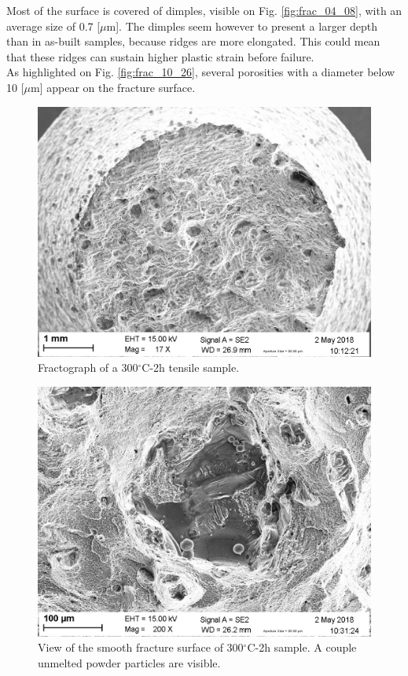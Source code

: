 Most of the surface is covered of dimples, visible on Fig. \ref{fig:frac_04_08}, with an average size of 0.7 [$\mu$m]. The dimples seem however to present a larger depth than in as-built samples, because ridges are more elongated. This could mean that these ridges can sustain higher plastic strain before failure.\\

As highlighted on Fig. \ref{fig:frac_10_26}, several porosities with a diameter below 10 [$\mu$m] appear on the fracture surface. \\

\begin{figure}[ht]
	\centering
	\centerline{\includegraphics[scale=0.40]{Images/frac-04_01.jpg}}
	\decoRule
	\caption[Fractograph of a 300$^\circ$C-2h tensile sample]{Fractograph of a 300$^\circ$C-2h tensile sample.}
	\label{fig:frac_04_01}
\end{figure}

\begin{figure}[ht]
	\centering
	\centerline{\includegraphics[scale=0.40]{Images/frac-04_11.jpg}}
	\decoRule
	\caption[View of the smooth fracture surface of 300$^\circ$C-2h sample. A couple unmelted powder particles are visible]{View of the smooth fracture surface of 300$^\circ$C-2h sample. A couple unmelted powder particles are visible.}
	\label{fig:frac_04_11}
\end{figure}

